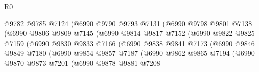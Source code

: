 \begin{lexlean}{R0}
\begin{coremodule}
                                  @9782
                                  @9785
                                  @7124
                                  (@6990
                                    @9790
                                    @9793
                                    @7131
                                    (@6990
                                      @9798
                                      @9801
                                      @7138
                                      (@6990
                                        @9806
                                        @9809
                                        @7145
                                        (@6990
                                          @9814
                                          @9817
                                          @7152
                                          (@6990
                                            @9822
                                            @9825
                                            @7159
                                            (@6990
                                              @9830
                                              @9833
                                              @7166
                                              (@6990
                                                @9838
                                                @9841
                                                @7173
                                                (@6990
                                                  @9846
                                                  @9849
                                                  @7180
                                                  (@6990
                                                    @9854
                                                    @9857
                                                    @7187
                                                    (@6990
                                                      @9862
                                                      @9865
                                                      @7194
                                                      (@6990
                                                        @9870
                                                        @9873
                                                        @7201
                                                        (@6990
                                                          @9878
                                                          @9881
                                                          @7208

\end{coremodule}
\end{lexlean}
